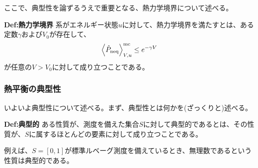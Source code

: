 \documentclass[a4paper,11pt]{jsarticle}
\numberwithin{equation}{section}
\begin{document}




ここで、典型性を論ずるうえで重要となる、熱力学境界について述べる。\\
\begin{itembox}[l]{\textbf{Def:熱力学境界}}
  系がエネルギー状態$u$に対して、熱力学境界を満たすとは、ある定数$\gamma$および$V_0$が存在して、
  \begin{align}
    \ev{\hat{P}_{\text{neq}}}^{\text{mc}}_{V,u} \leq e^{-\gamma V}
  \end{align}
  が任意の$V>V_0$に対して成り立つことである。
\end{itembox}


\subsubsection{熱平衡の典型性}
いよいよ典型性について述べる。まず、典型性とは何かを(ざっくりと)述べる。\\
\begin{itembox}[l]{\textbf{Def:典型的}}
  ある性質が、測度を備えた集合$S$に対して典型的であるとは、その性質が、$S$に属するほとんどの要素に対して成り立つことである。
\end{itembox}
例えば、$S = [0,1]$が標準ルベーグ測度を備えているとき、無理数であるという性質は典型的である。\\
\end{document}
